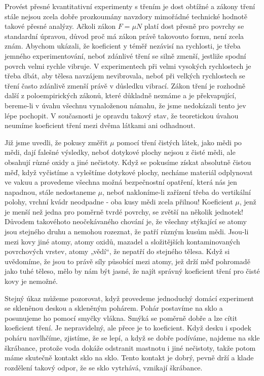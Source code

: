     Provést přesné kvantitativní experimenty s třením je dost obtížné a zákony tření stále nejsou 
    zcela dobře prozkoumány navzdory mimořádné technické hodnotě takové přesné analýzy. Ačkoli 
    zákon \(F= \mu N\) platí dost přesně pro povrchy se standardní úpravou, důvod proč má zákon 
    právě takovouto formu, není zcela znám. Abychom ukázali, že koeficient y téměř nezávisí na 
    rychlosti, je třeba jemného experimentování, neboť zdánlivé tření se silně zmenší, jestliže 
    spodní povrch velmi rychle vibruje. V experimentech při velmi vysokých rychlostech je třeba 
    dbát, aby tělesa navzájem nevibrovala, neboť při velkých rychlostech se tření často zdánlivě 
    zmenší právě v důsledku vibrací. Zákon tření je rozhodně další z poloempirických zákonů, které 
    důkladně neznáme a je překvapující, bereme-li v úvahu všechnu vynaloženou námahu, že jsme 
    nedokázali tento jev lépe pochopit. V současnosti je opravdu takový stav, že teoretickou úvahou 
    neumíme koeficient tření mezi dvěma látkami ani odhadnout.
    
    Již jsme uvedli, že pokusy změřit \(\mu\) pomocí tření čistých látek, jako mědi po mědi, dají 
    falešné výsledky, neboť dotykové plochy nejsou z čisté mědi, ale obsahují různé oxidy a jiné 
    nečistoty. Když se pokusíme získat absolutně čistou měď, když vyčistíme a vyleštíme dotykové 
    plochy, necháme materiál odplynovat ve vakuu a provedeme všechna možná bezpečnostní opatření, 
    která nás jen napadnou, stále nedostaneme \(\mu\), neboť nakloníme-li zařízení třeba do 
    vertikální polohy, vrchní kvádr neodpadne - oba kusy mědi zcela přilnou! Koeficient \(\mu\), 
    jenž je menší než jedna pro poměrně tvrdé povrchy, se zvětší na několik jednotek! Důvodem 
    takovéhoto neočekávaného chování je, že všechny stýkající se atomy jsou stejného druhu a 
    nemohou rozeznat, že patří různým kusům mědi. Jsou-li mezi kovy jiné atomy, atomy oxidů, 
    mazadel a složitějších kontaminovaných povrchových vrstev, atomy „vědí“, že nepatří do stejného 
    tělesa. Když si uvědomíme, že jsou to právě síly působící mezi atomy, jež drží měď pohromadě 
    jako tuhé těleso, mělo by nám být jasné, že najít správný koeficient tření pro čisté kovy je 
    nemožné.
    
    Stejný úkaz můžeme pozorovat, když provedeme jednoduchý domácí experiment se skleněnou deskou a 
    skleněným pohárem. Pohár postavíme na sklo a posunujeme ho pomocí smyčky vlákna. Smýká se 
    poměrně dobře a lze cítit koeficient tření. Je nepravidelný, ale přece je to koeficient. Když 
    desku i spodek poháru navlhčíme, zjistíme, že se lepí, a když se dobře podíváme, najdeme na 
    skle škrábance, protože voda dokáže odstranit mastnotu i jiné nečistoty, takže potom máme 
    skutečně kontakt sklo na sklo. Tento kontakt je dobrý, pevně drží a klade rozdělení takový 
    odpor, že se sklo vytrhává, vznikají škrábance.
    
